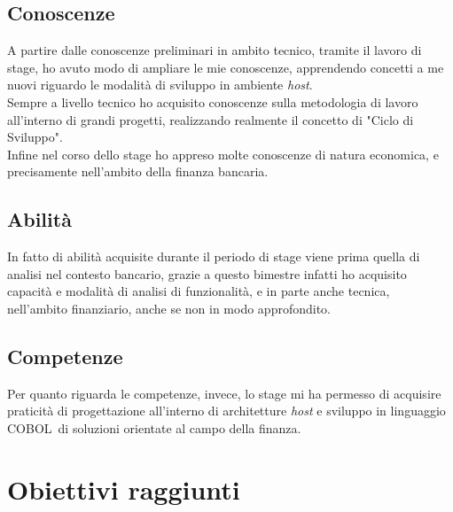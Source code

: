 \newpage

\subsection{Conoscenze}

A partire dalle conoscenze preliminari in ambito tecnico, tramite il lavoro di stage, ho avuto modo di ampliare le mie conoscenze, apprendendo concetti a me nuovi riguardo le modalità di sviluppo in ambiente \textit{host}.\\

Sempre a livello tecnico ho acquisito conoscenze sulla metodologia di lavoro all'interno di grandi progetti, realizzando realmente il concetto di "Ciclo di Sviluppo".\\

Infine nel corso dello stage ho appreso molte conoscenze di natura economica, e precisamente nell'ambito della finanza bancaria.

\subsection{Abilità}

In fatto di abilità acquisite durante il periodo di stage viene prima quella di analisi nel contesto bancario, grazie a questo bimestre infatti ho acquisito capacità e modalità di analisi di funzionalità, e in parte anche tecnica, nell'ambito finanziario, anche se non in modo approfondito.

\subsection{Competenze}

Per quanto riguarda le competenze, invece, lo stage mi ha permesso di acquisire praticità di progettazione all'interno di architetture \textit{host} e sviluppo in linguaggio COBOL\glossario\ di soluzioni orientate al campo della finanza.


\section{Obiettivi raggiunti}

